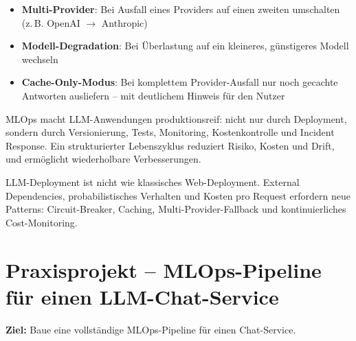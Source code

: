 \begin{itemize}[leftmargin=*]
    \item \textbf{Multi-Provider}: Bei Ausfall eines Providers auf einen zweiten umschalten (z.\,B. OpenAI $\rightarrow$ Anthropic)
    \item \textbf{Modell-Degradation}: Bei Überlastung auf ein kleineres, günstigeres Modell wechseln
    \item \textbf{Cache-Only-Modus}: Bei komplettem Provider-Ausfall nur noch gecachte Antworten ausliefern -- mit deutlichem Hinweis für den Nutzer
\end{itemize}

\begin{zusammenfassungEnv}
MLOps macht LLM-Anwendungen produktionsreif: nicht nur durch Deployment, sondern durch Versionierung, Tests, Monitoring, Kostenkontrolle und Incident Response. Ein strukturierter Lebenszyklus reduziert Risiko, Kosten und Drift, und ermöglicht wiederholbare Verbesserungen.
\end{zusammenfassungEnv}




\par\mbox{}\par
\begin{merkeEnv}
LLM-Deployment ist nicht wie klassisches Web-Deployment. External Dependencies, probabilistisches Verhalten und Kosten pro Request erfordern neue Patterns: Circuit-Breaker, Caching, Multi-Provider-Fallback und kontinuierliches Cost-Monitoring.
\end{merkeEnv}

\section{Praxisprojekt -- MLOps-Pipeline für einen LLM-Chat-Service}

\textbf{Ziel:} Baue eine vollständige MLOps-Pipeline für einen Chat-Service.

